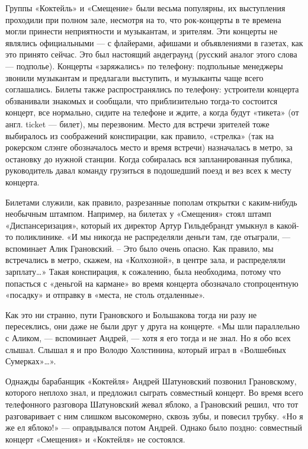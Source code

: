 \documentclass[16pt,a5paper,oneside]{book}
\begin{document}
Группы «Коктейль» и «Смещение» были весьма популярны, их выступления проходили при полном зале, несмотря на то, что
рок-концерты в те времена могли принести неприятности и музыкантам, и зрителям. Эти концерты не являлись официальными —
с флайерами, афишами и объявлениями в газетах, как это принято сейчас. Это был настоящий андеграунд (русский аналог
этого слова — подполье). Концерты «заряжались» по телефону: подпольные менеджеры звонили музыкантам и предлагали
выступить, и музыканты чаще всего соглашались. Билеты также распространялись по телефону: устроители концерта
обзванивали знакомых и сообщали, что приблизительно тогда-то состоится концерт, все нормально, сидите на телефоне и
ждите, а когда будут «тикета» (от англ. ticket — билет), мы перезвоним. Место для встречи зрителей тоже выбиралось из
соображений конспирации, как правило, «стрелка» (так на рокерском слэнге обозначалось место и время встречи) назначалась
в метро, за остановку до нужной станции. Когда собиралась вся запланированная публика, руководитель давал команду
грузиться в подошедший поезд и вез всех к месту концерта.

Билетами служили, как правило, разрезанные пополам открытки с каким-нибудь необычным штампом. Например, на билетах у
«Смещения» стоял штамп «Диспансеризация», который их директор Артур Гильдебрандт умыкнул в какой-то поликлинике. «И мы
никогда не распределяли деньги там, где отыграли, — вспоминает Алик Грановский. – Это было очень опасно. Как правило, мы
встречались в метро, скажем, на «Колхозной», в центре зала, и распределяли зарплату\ldots» Такая конспирация, к
сожалению, была необходима, потому что попасться с «деньгой на кармане» во время концерта обозначало стопроцентную
«посадку» и отправку в «места, не столь отдаленные».

Как это ни странно, пути Грановского и Большакова тогда ни разу не пересеклись, они даже не были друг у друга на
концерте. «Мы шли параллельно с Аликом, — вспоминает Андрей, — хотя я его тогда и не знал. Но я обо всех слышал. Слышал
я и про Володю Холстинина, который играл в «Волшебных Сумерках»\ldots».

Однажды барабанщик «Коктейля» Андрей Шатуновский позвонил Грановскому, которого неплохо знал, и предложил сыграть
совместный концерт. Во время всего телефонного разговора Шатуновский жевал яблоко, а Грановский решил, что тот
разговаривает с ним слишком высокомерно, сквозь зубы, и повесил трубку. «Но я же ел яблоко!» — оправдывался потом
Андрей. Однако было поздно: совместный концерт «Смещения» и «Коктейля» не состоялся.
\end{document}
